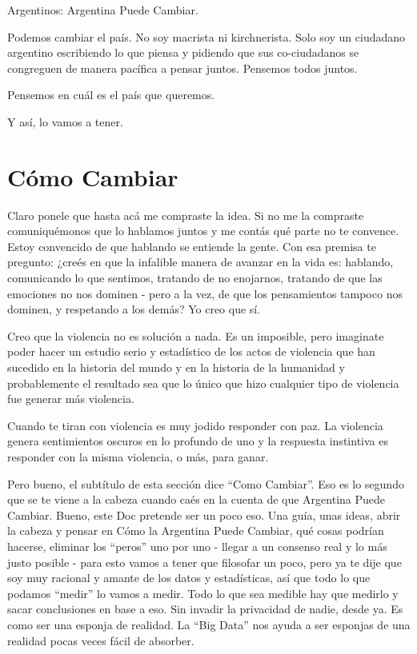 \documentclass[
]{book}
\begin{document}
Argentinos: Argentina Puede Cambiar.

Podemos cambiar el país. No soy macrista ni kirchnerista. Solo soy un ciudadano argentino escribiendo lo que piensa y pidiendo que sus co-ciudadanos se congreguen de manera pacífica a pensar juntos. Pensemos todos juntos.

Pensemos en cuál es el país que queremos.

Y así, lo vamos a tener.

\hypertarget{cuxf3mo-cambiar}{%
\section{Cómo Cambiar}\label{cuxf3mo-cambiar}}

Claro ponele que hasta acá me compraste la idea. Si no me la compraste comuniquémonos que lo hablamos juntos y me contás qué parte no te convence. Estoy convencido de que hablando se entiende la gente. Con esa premisa te pregunto: ¿creés en que la infalible manera de avanzar en la vida es: hablando, comunicando lo que sentimos, tratando de no enojarnos, tratando de que las emociones no nos dominen - pero a la vez, de que los pensamientos tampoco nos dominen, y respetando a los demás? Yo creo que sí.

Creo que la violencia no es solución a nada. Es un imposible, pero imaginate poder hacer un estudio serio y estadístico de los actos de violencia que han sucedido en la historia del mundo y en la historia de la humanidad y probablemente el resultado sea que lo único que hizo cualquier tipo de violencia fue generar más violencia.

Cuando te tiran con violencia es muy jodido responder con paz. La violencia genera sentimientos oscuros en lo profundo de uno y la respuesta instintiva es responder con la misma violencia, o más, para ganar.

Pero bueno, el subtítulo de esta sección dice ``Como Cambiar''. Eso es lo segundo que se te viene a la cabeza cuando caés en la cuenta de que Argentina Puede Cambiar. Bueno, este Doc pretende ser un poco eso. Una guía, unas ideas, abrir la cabeza y pensar en Cómo la Argentina Puede Cambiar, qué cosas podrían hacerse, eliminar los ``peros'' uno por uno - llegar a un consenso real y lo más justo posible - para esto vamos a tener que filosofar un poco, pero ya te dije que soy muy racional y amante de los datos y estadísticas, así que todo lo que podamos ``medir'' lo vamos a medir. Todo lo que sea medible hay que medirlo y sacar conclusiones en base a eso. Sin invadir la privacidad de nadie, desde ya. Es como ser una esponja de realidad. La ``Big Data'' nos ayuda a ser esponjas de una realidad pocas veces fácil de absorber.
\end{document}
